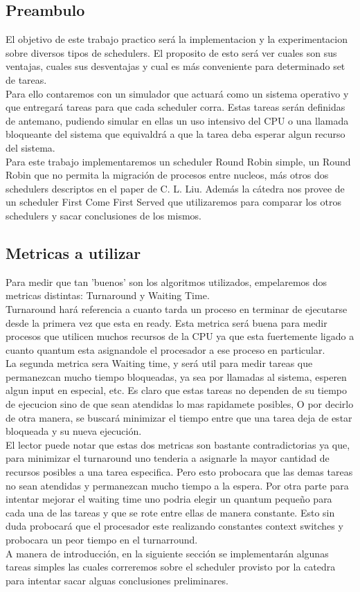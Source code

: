 \subsection{Preambulo}
El objetivo de este trabajo practico será la implementacion y la experimentacion sobre diversos tipos de schedulers. El proposito de esto será ver cuales son sus ventajas, cuales sus desventajas y cual es más conveniente para determinado set de tareas.
\\
Para ello contaremos con un simulador que actuará como un sistema operativo y que entregará tareas para que cada scheduler corra. Estas tareas serán definidas de antemano, pudiendo simular en ellas un uso intensivo del CPU o una llamada bloqueante del sistema que equivaldrá a que la tarea deba esperar algun recurso del sistema.
\\
Para este trabajo implementaremos un scheduler Round Robin simple, un Round Robin que no permita la migración de procesos entre nucleos, más otros dos schedulers descriptos en el paper de C. L. Liu. Además la cátedra nos provee de un scheduler First Come First Served que utilizaremos para comparar los otros schedulers y sacar conclusiones de los mismos.

\subsection{Metricas a utilizar}

Para medir que tan 'buenos' son los algoritmos utilizados, empelaremos dos metricas distintas: Turnaround y Waiting Time.
\\
Turnaround hará referencia a cuanto tarda un proceso en terminar de ejecutarse desde la primera vez que esta en ready. Esta metrica será buena para medir procesos que utilicen muchos recursos de la CPU ya que esta fuertemente ligado a cuanto quantum esta asignandole el procesador a ese proceso en particular.
\\
La segunda metrica sera Waiting time, y será util para medir tareas que permanezcan mucho tiempo bloqueadas, ya sea por llamadas al sistema, esperen algun input en especial, etc. Es claro que estas tareas no dependen de su tiempo de ejecucion sino de que sean atendidas lo mas rapidamete posibles, O por decirlo de otra manera, se buscará minimizar el tiempo entre que una tarea deja de estar bloqueada y su nueva ejecución.
\\
El lector puede notar que estas dos metricas son bastante contradictorias ya que, para minimizar el turnaround uno tenderia a asignarle la mayor cantidad de recursos posibles a una tarea especifica. Pero esto probocara que las demas tareas no sean atendidas y permanezcan mucho tiempo a la espera. Por otra parte para intentar mejorar el waiting time uno podria elegir un quantum pequeño para cada una de las tareas y que se rote entre ellas de manera constante. Esto sin duda probocará que el procesador este realizando constantes context switches y probocara un peor tiempo en el turnarround.
\\
A manera de introducción, en la siguiente sección se implementarán algunas tareas simples las cuales correremos sobre el scheduler provisto por la catedra para intentar sacar alguas conclusiones preliminares.
